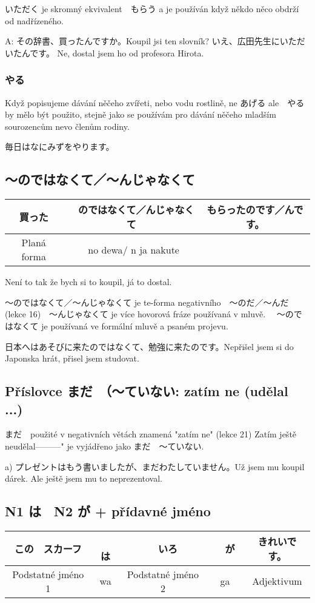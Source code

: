 いただく je skromný ekvivalent　もらう a je používán když někdo něco obdrží od nadřízeného.

A: その辞書、買ったんですか。Koupil jsi ten slovník?
いえ、広田先生にいただいたんです。 Ne, dostal jsem ho od profesora Hirota.

\subsubsection{やる}

Když popisujeme dávání něčeho zvířeti, nebo vodu rostlině, ne あげる ale　やる by mělo být použito, stejně jako se používám pro dávání něčeho mladším sourozencům nevo členům rodiny.


毎日はなにみずをやります。

\subsection{〜のではなくて／〜んじゃなくて}
\begin{tabular}{||c|c||c||}
\hline
買った&　のではなくて／んじゃなくて　&もらったのです／んです。\\
\hline
Planá forma & no dewa/ n ja nakute& \\
\hline
\end{tabular}
Není to tak že bych si to koupil, já to dostal.


〜のではなくて／〜んじゃなくて je te-forma negativního　〜のだ／〜んだ (lekce 16)　〜んじゃなくて je více hovorová fráze používaná v mluvě. 　〜のではなくて je používaná ve formální mluvě a psaném projevu.

日本へはあそびに来たのではなくて、勉強に来たのです。Nepřišel jsem si do Japonska hrát, přisel jsem studovat.


\subsection{Příslovce まだ　（〜ていない: zatím ne (udělal ...)}

まだ　použité v negativních větách znamená "zatím ne" (lekce 21) Zatím ještě neudělal---------" je vyjádřeno jako まだ　〜ていない.

a) プレゼントはもう書いましたが、まだわたしていません。Už jsem mu koupil dárek. Ale ještě jsem mu to neprezentoval.




\subsection{N1 は　N2 が + přídavné jméno}
\begin{tabular}{||c|c||c|c||c||}
\hline
この　スカーフ&　は&　いろ&　が　&きれいです。 \\
\hline
Podstatné jméno 1 & wa & Podstatné jméno 2 & ga& Adjektivum\\
\hline
\end{tabular}

